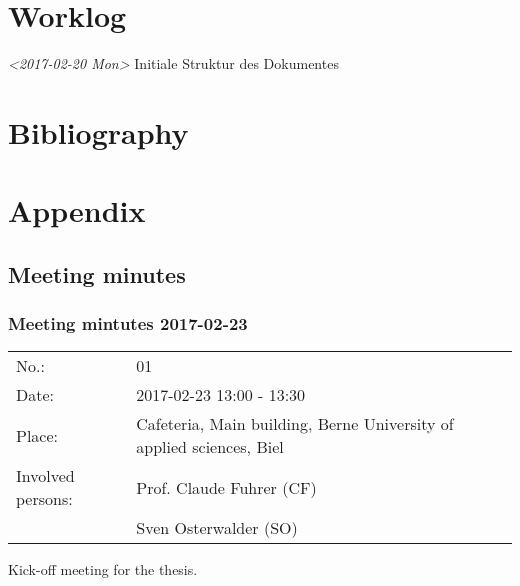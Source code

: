 \documentclass[10pt, openright, notitlepage]{scrreprt}
\begin{document}
\chapter{Worklog}
\label{sec:orgc620b9b}

\textit{<2017-02-20 Mon> } Initiale Struktur des Dokumentes

\chapter{Bibliography}
\label{sec:org3ec2262}

\printbibliography{}

\chapter{Appendix}
\label{sec:orgb9f659c}

\section{Meeting minutes}
\label{sec:org4d9a7ad}

\subsection{Meeting mintutes 2017-02-23}
\label{sec:org67f788d}

\begin{center}
\begin{tabular}{ll}
No.: & 01\\
Date: & 2017-02-23 13:00 - 13:30\\
Place: & Cafeteria, Main building, Berne University of applied sciences, Biel\\
Involved persons: & Prof. Claude Fuhrer (CF)\\
 & Sven Osterwalder (SO)\\
\end{tabular}
\end{center}

Kick-off meeting for the thesis.
\end{document}
